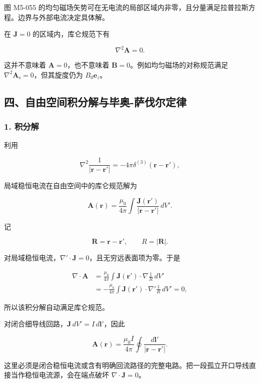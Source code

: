图 M5-055
的均匀磁场矢势可在无电流的局部区域内非零，且分量满足拉普拉斯方程。边界与外部电流决定具体解。

在 \(\mathbf J=0\) 的区域内，库仑规范下有

\[
\nabla^2\mathbf A=0.
\]

这并不意味着 \(\mathbf A=0\)，也不意味着
\(\mathbf B=0\)。例如均匀磁场的对称规范满足
\(\nabla^2\mathbf A_{\mathrm{s}}=0\)，但其旋度仍为 \(B_0\mathbf e_z\)。

\subsection{四、自由空间积分解与毕奥-萨伐尔定律}\label{m5:ux56dbux81eaux7531ux7a7aux95f4ux79efux5206ux89e3ux4e0eux6bd5ux5965-ux8428ux4f10ux5c14ux5b9aux5f8b}

\subsubsection{1. 积分解}\label{m5:ux79efux5206ux89e3}

利用

\[
\nabla^2\frac{1}{|\mathbf r-\mathbf r'|}
=-4\pi\delta^{(3)}(\mathbf r-\mathbf r'),
\]

局域稳恒电流在自由空间中的库仑规范解为

\[
\boxed{
\mathbf A(\mathbf r)
=\frac{\mu_0}{4\pi}
\int\frac{\mathbf J(\mathbf r')}{|\mathbf r-\mathbf r'|}\,dV'
}.
\]

记

\[
\mathbf R=\mathbf r-\mathbf r',
\qquad R=|\mathbf R|.
\]

对局域稳恒电流，\(\nabla'\cdot\mathbf J=0\)，且无穷远表面项为零。于是

\[
\begin{aligned}
\nabla\cdot\mathbf A
&=\frac{\mu_0}{4\pi}
\int\mathbf J(\mathbf r')\cdot\nabla\frac1R\,dV'\\
&=-\frac{\mu_0}{4\pi}
\int\mathbf J(\mathbf r')\cdot\nabla'\frac1R\,dV'=0,
\end{aligned}
\]

所以该积分解自动满足库仑规范。

对闭合细导线回路，\(\mathbf J\,dV'=I\,d\mathbf l'\)，因此

\[
\boxed{
\mathbf A(\mathbf r)
=\frac{\mu_0I}{4\pi}
\oint\frac{d\mathbf l'}{|\mathbf r-\mathbf r'|}
}.
\]

这里必须是闭合稳恒电流或含有明确回流路径的完整电路。把一段孤立开口导线直接当作稳恒电流源，会在端点破坏
\(\nabla\cdot\mathbf J=0\)。

